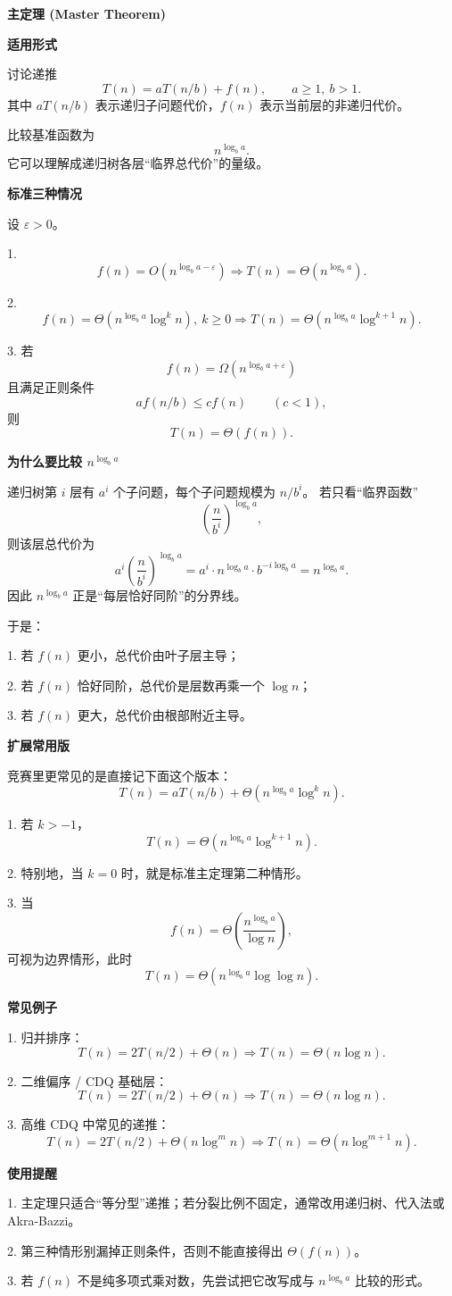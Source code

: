 \textbf{主定理 (Master Theorem)}

\textbf{适用形式}

讨论递推
\[
T(n)=aT(n/b)+f(n), \qquad a\ge 1,\ b>1.
\]
其中 \(aT(n/b)\) 表示递归子问题代价，\(f(n)\) 表示当前层的非递归代价。

比较基准函数为
\[
n^{\log_b a}.
\]
它可以理解成递归树各层“临界总代价”的量级。


\textbf{标准三种情况}

设 \(\varepsilon>0\)。

1. \[
f(n)=O(n^{\log_b a-\varepsilon}) \Rightarrow T(n)=\Theta(n^{\log_b a}).
\]

2. \[
f(n)=\Theta(n^{\log_b a}\log^k n),\ k\ge 0 \Rightarrow T(n)=\Theta(n^{\log_b a}\log^{k+1} n).
\]

3. 若
\[
f(n)=\Omega(n^{\log_b a+\varepsilon})
\]
且满足正则条件
\[
af(n/b)\le c f(n)\qquad (c<1),
\]
则
\[
T(n)=\Theta(f(n)).
\]


\textbf{为什么要比较 \(n^{\log_b a}\)}

递归树第 \(i\) 层有 \(a^i\) 个子问题，每个子问题规模为 \(n/b^i\)。
若只看“临界函数”
\[
\left(\frac{n}{b^i}\right)^{\log_b a},
\]
则该层总代价为
\[
a^i\left(\frac{n}{b^i}\right)^{\log_b a}
=
a^i\cdot n^{\log_b a}\cdot b^{-i\log_b a}
=
n^{\log_b a}.
\]
因此 \(n^{\log_b a}\) 正是“每层恰好同阶”的分界线。

于是：

1. 若 \(f(n)\) 更小，总代价由叶子层主导；

2. 若 \(f(n)\) 恰好同阶，总代价是层数再乘一个 \(\log n\)；

3. 若 \(f(n)\) 更大，总代价由根部附近主导。


\textbf{扩展常用版}

竞赛里更常见的是直接记下面这个版本：
\[
T(n)=aT(n/b)+\Theta(n^{\log_b a}\log^k n).
\]

1. 若 \(k>-1\)，
\[
T(n)=\Theta(n^{\log_b a}\log^{k+1} n).
\]

2. 特别地，当 \(k=0\) 时，就是标准主定理第二种情形。

3. 当
\[
f(n)=\Theta\!\left(\frac{n^{\log_b a}}{\log n}\right),
\]
可视为边界情形，此时
\[
T(n)=\Theta(n^{\log_b a}\log\log n).
\]


\textbf{常见例子}

1. 归并排序：
\[
T(n)=2T(n/2)+\Theta(n) \Rightarrow T(n)=\Theta(n\log n).
\]

2. 二维偏序 / CDQ 基础层：
\[
T(n)=2T(n/2)+\Theta(n) \Rightarrow T(n)=\Theta(n\log n).
\]

3. 高维 CDQ 中常见的递推：
\[
T(n)=2T(n/2)+\Theta(n\log^m n) \Rightarrow T(n)=\Theta(n\log^{m+1} n).
\]


\textbf{使用提醒}

1. 主定理只适合“等分型”递推；若分裂比例不固定，通常改用递归树、代入法或 Akra-Bazzi。

2. 第三种情形别漏掉正则条件，否则不能直接得出 \(\Theta(f(n))\)。

3. 若 \(f(n)\) 不是纯多项式乘对数，先尝试把它改写成与 \(n^{\log_b a}\) 比较的形式。
